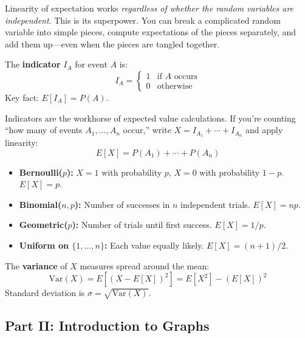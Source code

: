 \begin{keyresult}
Linearity of expectation works \emph{regardless of whether the random variables are independent}. This is its superpower. You can break a complicated random variable into simple pieces, compute expectations of the pieces separately, and add them up---even when the pieces are tangled together.
\end{keyresult}

\begin{definition}
The \textbf{indicator} $I_A$ for event $A$ is:
\[
I_A = \begin{cases} 1 & \text{if } A \text{ occurs} \\ 0 & \text{otherwise} \end{cases}
\]
Key fact: $E[I_A] = P(A)$.
\end{definition}

Indicators are the workhorse of expected value calculations. If you're counting ``how many of events $A_1, \ldots, A_n$ occur,'' write $X = I_{A_1} + \cdots + I_{A_n}$ and apply linearity:
\[
E[X] = P(A_1) + \cdots + P(A_n)
\]

\begin{definition}
\begin{itemize}
  \item \textbf{Bernoulli($p$):} $X = 1$ with probability $p$, $X = 0$ with probability $1-p$. $E[X] = p$.
  \item \textbf{Binomial($n, p$):} Number of successes in $n$ independent trials. $E[X] = np$.
  \item \textbf{Geometric($p$):} Number of trials until first success. $E[X] = 1/p$.
  \item \textbf{Uniform on $\{1, \ldots, n\}$:} Each value equally likely. $E[X] = (n+1)/2$.
\end{itemize}
\end{definition}

\begin{definition}[Variance]
The \textbf{variance} of $X$ measures spread around the mean:
\[
\text{Var}(X) = E[(X - E[X])^2] = E[X^2] - (E[X])^2
\]
Standard deviation is $\sigma = \sqrt{\text{Var}(X)}$.
\end{definition}

\subsection*{Part II: Introduction to Graphs}

